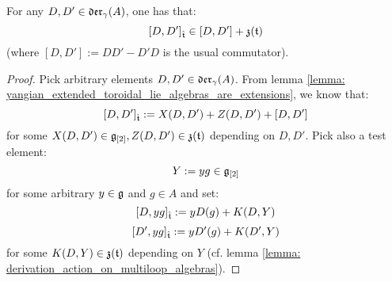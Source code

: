         \begin{proposition} \label{prop: appearance_of_toroidal_cocycles}
            For any $D, D' \in \mathfrak{der}_{\gamma}(A)$, one has that:
                $$[D, D']_{\hat{\mathfrak{t}}} \in [D, D'] + \mathfrak{z}(\mathfrak{t})$$
            (where $[D, D'] := DD' - D'D$ is the usual commutator).
        \end{proposition}
            \begin{proof}
                Pick arbitrary elements $D, D' \in \mathfrak{der}_{\gamma}(A)$. From lemma \ref{lemma: yangian_extended_toroidal_lie_algebras_are_extensions}, we know that:
                    $$[D, D']_{\hat{\mathfrak{t}}} := X(D, D') + Z(D, D') + [D, D']$$
                for some $X(D, D') \in \mathfrak{g}_{[2]}, Z(D, D') \in \mathfrak{z}(\mathfrak{t})$ depending on $D, D'$. Pick also a test element:
                    $$Y := yg \in \mathfrak{g}_{[2]}$$
                for some arbitrary $y \in \mathfrak{g}$ and $g \in A$ and set:
                    $$[D, y g]_{\hat{\mathfrak{t}}} := y D( g ) + K(D, Y)$$
                    $$[D', y g]_{\hat{\mathfrak{t}}} := y D'( g ) + K(D', Y)$$
                for some $K(D, Y) \in \mathfrak{z}(\mathfrak{t})$ depending on $Y$ (cf. lemma \ref{lemma: derivation_action_on_multiloop_algebras}).
                

\end{proof}

